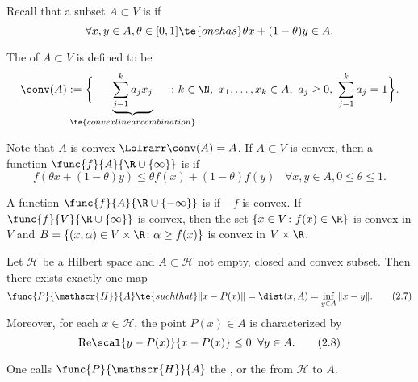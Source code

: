 Recall that a subset $A\subset V$ is  if
\[\forall x,y\in A,\theta\in[0,1]\te{ one has }\theta x+(1-\theta)y\in A.\]
\begin{figure}[!h]\vspace{-5mm}
    \centering
\end{figure}

The  of $A\subset V$ is defined to be
\[ \conv(A):=\bigg\{\hspace{-8mm}\underbrace{\sum_{j=1}^ka_jx_j}_{\scriptsize\te{convex linear combination}}
\hspace{-8mm}\colon k\in\N,\ x_1,\ldots,x_k\in A,\ a_j\geq0,\ \sum_{j=1}^ka_j=1\bigg\}.\]

Note that $A$ is convex $\Lolrarr\conv(A)=A$. If $A\subset V$ is convex, then a function 
$\func{f}{A}{\R\cup\{\infty\}}$ is  if 
\[f(\theta x+(1-\theta)y)\leq\theta f(x)+(1-\theta)f(y)\;\;\;\forall x,y\in A,0\leq\theta\leq 1.\tag{2.6}\label{2.6}\]

A function $\func{f}{A}{\R\cup\{-\infty\}}$ is  if $-f$ is convex. 
If $\func{f}{V}{\R\cup\{\infty\}}$ is convex, then the set $\{x\in V\colon f(x)\in\R\}$ is convex 
in $V$ and $B=\{(x,\alpha)\in V\times\R\colon \alpha\geq f(x)\}$ is convex in $V\times\R$.
\renewcommand{\H}{\mathscr{H}}
\begin{thm}\label{ii.7}
    Let $\H$ be a Hilbert space and $A\subset\H$ not empty, closed and convex subset. 
    Then there exists exactly one map
    \[\func{P}{\H}{A}\te{ such that }\|x-P(x)\|=\dist(x,A)=\inf_{y\in A}\|x-y\|.\tag{2.7}\label{2.7}\]
    Moreover, for each $x\in\H$, the point $P(x)\in A$ is characterized by
    \[\mathrm{Re}\scal{y-P(x)}{x-P(x)}\leq0\;\;\forall y\in A.\tag{2.8}\label{2.8}\]

    One calls $\func{P}{\H}{A}$ the , or the  from $\H$ to $A$.
\end{thm}

